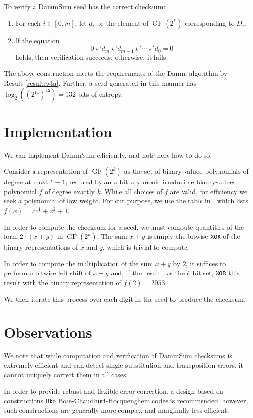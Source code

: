 \documentclass{article}
\theoremstyle{plain}
\theoremstyle{definition}
\newcommand{\GF}{\operatorname{GF}}
\begin{document}
To verify a DammSum seed has the correct checksum:
\begin{enumerate}
	\item For each $i \in [0,m]$, let $d_i$ be the element of $\GF(2^k)$ corresponding to $D_i$.
	\item If the equation
	\[ 0 \star' d_m \star' d_{m-1} \star' \cdots \star' d_0 = 0 \]
	holds, then verification succeeds; otherwise, it fails.
\end{enumerate}

The above construction meets the requirements of the Damm algorithm by Result \ref{result:wta}.
Further, a seed generated in this manner has $\log_2\left((2^{11})^{12}\right) = 132$ bits of entropy.


\section{Implementation}

We can implement DammSum efficiently, and note here how to do so.

Consider a representation of $\GF(2^k)$ as the set of binary-valued polynomials of degree at most $k-1$, reduced by an arbitrary monic irreducible binary-valued polynomial $f$ of degree exactly $k$.
While all choices of $f$ are valid, for efficiency we seek a polynomial of low weight.
For our purpose, we use the table in \cite{hp}, which lists $f(x) = x^{11} + x^2 + 1$.

In order to compute the checksum for a seed, we must compute quantities of the form $2 \cdot (x + y)$ in $\GF(2^k)$.
The sum $x + y$ is simply the bitwise \texttt{XOR} of the binary representations of $x$ and $y$, which is trivial to compute.

In order to compute the multiplication of the sum $x + y$ by $2$, it suffices to perform a bitwise left shift of $x + y$ and, if the result has the $k$ bit set, \texttt{XOR} this result with the binary representation of $f(2) = 2053$.

We then iterate this process over each digit in the seed to produce the checksum.


\section{Observations}

We note that while computation and verification of DammSum checksums is extremely efficient and can detect single substitution and transposition errors, it cannot uniquely correct them in all cases.

In order to provide robust and flexible error correction, a design based on constructions like Bose-Chaudhuri-Hocquenghem codes \cite{hocquenghem,bose} is recommended; however, such constructions are generally more complex and marginally less efficient.




\end{document}
